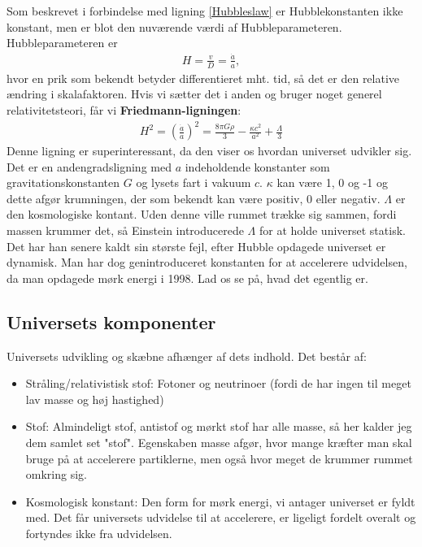 Som beskrevet %
i forbindelse med ligning \ref{Hubbleslaw} er Hubblekonstanten ikke konstant, men er blot den nuværende værdi af Hubbleparameteren. Hubbleparameteren er
\begin{align}
H=\frac{v}{D}=\frac{\dot{a}}{a},
\end{align}
hvor en prik som bekendt betyder differentieret mht. tid, så det er den relative ændring i skalafaktoren. Hvis vi sætter det i anden og bruger noget generel relativitetsteori, får vi \textbf{Friedmann-ligningen}:
\begin{align}
H^2=\left(\frac{\dot{a}}{a}\right)^2=\frac{8\pi G \rho}{3}-\frac{\kappa c^2}{a^2}+\frac{\Lambda}{3}
\end{align}
Denne ligning er superinteressant, da den viser os hvordan universet udvikler sig. Det er en andengradsligning med $a$ indeholdende konstanter som gravitationskonstanten $G$ og lysets fart i vakuum $c$. $\kappa$ kan være 1, 0 og -1 og dette afgør krumningen, der som bekendt kan være positiv, 0 eller negativ. $\Lambda$ er den kosmologiske kontant. Uden denne ville rummet trække sig sammen, fordi massen krummer det, så Einstein introducerede $\Lambda$ for at holde universet statisk. Det har han senere kaldt sin største fejl, efter Hubble opdagede universet er dynamisk. Man har dog genintroduceret konstanten for at accelerere udvidelsen, da man opdagede mørk energi i 1998. Lad os se på, hvad det egentlig er.

\subsection{Universets komponenter} \label{bestanddele}
Universets udvikling og skæbne afhænger af dets indhold. Det består af:
\begin{itemize}
	\item Stråling/relativistisk stof: Fotoner og neutrinoer (fordi de har ingen til meget lav masse og høj hastighed)
	\item Stof: Almindeligt stof, antistof og mørkt stof har alle masse, så her kalder jeg dem samlet set "stof". Egenskaben masse afgør, hvor mange kræfter man skal bruge på at accelerere partiklerne, men også hvor meget de krummer rummet omkring sig. 
	\item Kosmologisk konstant: Den form for mørk energi, vi antager universet er fyldt med. Det får universets udvidelse til at accelerere, er ligeligt fordelt overalt og fortyndes ikke fra udvidelsen.
\end{itemize}

